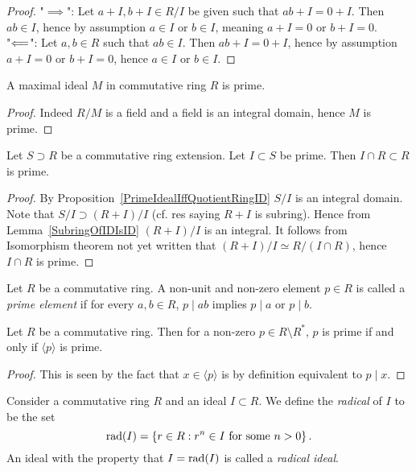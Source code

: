 \begin{proof}
    "$\implies$": Let $a+I,b+I\in R/I$ be given such that $ab + I = 0 +I$. Then $ab\in I$, hence by assumption $a \in I$ or $b\in I$, meaning $a + I = 0$ or $b+ I =0$.\\
    "$\Longleftarrow$": Let $a,b\in R$ such that $ab \in I$. Then $ab + I = 0 + I$, hence by assumption $a+I = 0$ or $b + I = 0$, hence $a\in I$ or $b\in I$. 
\end{proof}
\begin{corollary}
    A maximal ideal $M$ in commutative ring $R$ is prime.
\end{corollary}
\begin{proof}
    Indeed $R/M$ is a field and a field is an integral domain, hence $M$ is prime.
\end{proof}
\begin{proposition}\label{EliminationIdealOfPrimeIdealIsPrime}
    Let $S\supset R$ be a commutative ring extension. Let $I\subset S$ be prime. Then $I\cap R\subset R$ is prime.  
\end{proposition}
\begin{proof}
    By Proposition~\ref{PrimeIdealIffQuotientRingID} $S/I$ is an integral domain. Note that $S/I\supset (R+I)/I$ (cf. {\LARGE res saying $R+I$ is subring}). Hence from Lemma~\ref{SubringOfIDIsID} $(R+I)/I$ is an integral. It follows from {\LARGE Isomorphism theorem not yet written} that $(R+I)/I\simeq R/(I\cap R)$, hence $I\cap R$ is prime.
\end{proof}
\begin{definition}
    Let $R$ be a commutative ring. A non-unit and non-zero element $p \in R$ is called a \textit{prime element} if for every $a,b\in R$, $p\mid ab$ implies $p\mid a$ or $p\mid b$. 
\end{definition}
\begin{lemma}\label{PrimeElementsGeneratePrimeIdeals}
    Let $R$ be a commutative ring. Then for a non-zero $p\in R\setminus R^\ast$, $p$ is prime if and only if $\langle p \rangle$ is prime.
\end{lemma}
\begin{proof}
    This is seen by the fact that $x \in \langle p\rangle $ is by definition equivalent to $p\mid x$. 
\end{proof}
\begin{definition}
    Consider a commutative ring $R$ and an ideal $I \subset R$. We define the \textit{radical} of $I$ to be the set
    $$\mathrm{rad}(I)= \left\{ r\in R : r^n\in I \text{ for some } n>0 \right\}.$$
    An ideal with the property that $I = \mathrm{rad}(I)$ is called a \textit{radical ideal}. 
\end{definition}
